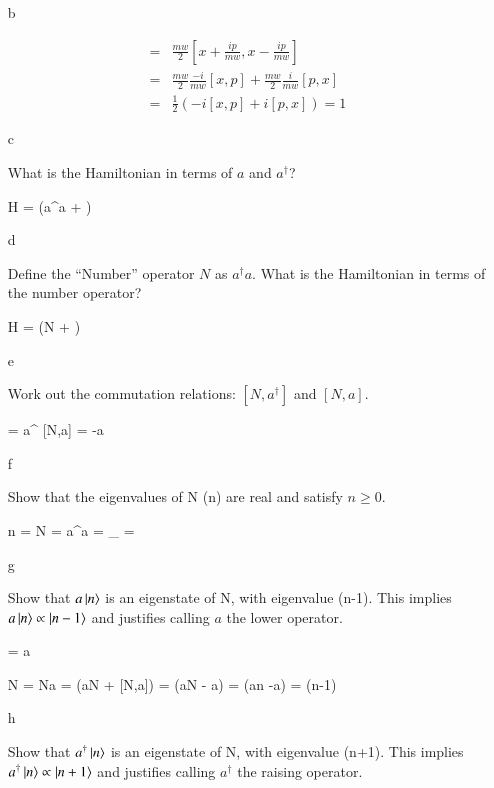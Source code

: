 {{\begin{itemize}
{\textit{Solution:}
\be
x =  (a + a^\dagger) \hspace{0.5in}  p =  (a - a^\dagger)
\ee 
where $x_0 = \sqrt{\frac{1}{mw}}$.

}
\item[b]{ 

\begin{eqnarray*}
[a,a^\dagger] =& \frac{mw}{2} [ x + \frac{i p}{mw }, x -  \frac{ip}{mw}]\\
              =& \frac{mw}{2}\frac{-i}{mw} [ x , p] + \frac{mw}{2}\frac{i}{mw} [p,x]\\
              =& \frac{1}{2}(-i [ x , p] + i [p,x]) = 1
\end{eqnarray*}

}
\item[c]{ 
What is the Hamiltonian in terms of $a$ and $a^\dagger$?

\be
H = \omega(a^\dagger a + )
\ee
}
\item[d]{ 
Define the ``Number'' operator $N$ as $a^\dagger a$.  What is the Hamiltonian in terms of the number operator?

\be
H = \omega(N + )
\ee


}
\item[e]{ 
Work out the commutation relations: $[N,a^\dagger]$ and $[N,a]$.

\be
[N,a^\dagger] = a^\dagger  \hspace{0.5in} [N,a] = -a
\ee

}
\item[f]{ 
Show that the eigenvalues of N (n) are real and satisfy $n \geq 0$.

\be
n = N = a^\dagger a  = _{} =  
\ee


}
\item[g]{ 
Show that $a \ket n$  is an eigenstate of N, with eigenvalue (n-1). This implies $a \ket{n} \propto \ket{n-1}$ and justifies calling $a$ the lower operator.

\be
{} = a 
\ee

\be
N = Na = (aN + [N,a]) = (aN - a) = (an -a) = (n-1)
\ee


}
\item[h]{ 
Show that $a^\dagger \ket n$  is an eigenstate of N, with eigenvalue (n+1). This implies $a^\dagger \ket{n} \propto \ket{n+1}$ and justifies calling $a^\dagger$ the raising operator.


}
\end{itemize}}}
